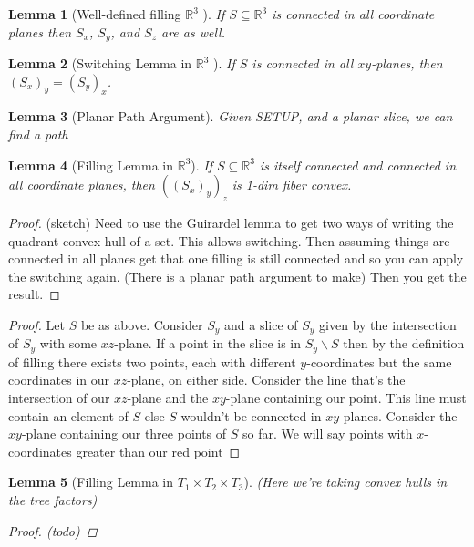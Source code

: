 \documentclass{article}
\newcommand{\sxyz}{((S_x)_y)_z}
\theoremstyle{mystyle}
\newtheorem{lem}{Lemma}[section]
\theoremstyle{remark}
\begin{document}
\begin{lem}
	[Well-defined filling \(\mathbb{R}^{3}\) ]

	If \(S \subseteq \mathbb{R}^{3}\) is connected in all coordinate planes then \(S_x\), \(S_{y}\), and \(S_{z}\) are as well. 
	

\end{lem}

\begin{lem}
	[Switching Lemma in \(\mathbb{R}^{3}\) ]
	 \label{lem:switch} 
	 If \(S\) is connected in all \(xy\)-planes, then \((S_{x})_{y} = (S_{y})_{x}\).
	
\end{lem}
\begin{lem}
    [Planar Path Argument]
    Given SETUP, and a planar slice, we can find a path
\end{lem}
\begin{lem}
    [Filling Lemma in \(\mathbb{R}^{3}\)]
	\label{lem:fillr3}
	If \(S \subseteq \mathbb{R}^{3}\) is itself connected and connected in all coordinate planes, then \(\sxyz\) is 1-dim fiber convex.
\end{lem}
\begin{proof}
    (sketch) Need to use the Guirardel lemma to get two ways of writing the quadrant-convex hull of a set. This allows switching. Then assuming things are connected in all planes get that one filling is still connected and so you can apply the switching again. (There is a planar path argument to make) Then you get the result.
\end{proof}
\begin{proof}
	Let \(S\) be as above. Consider \(S_{ y}\) and a slice of \(S_{ y}\) given by the intersection of \(S_{ y}\) with some \(xz\)-plane. If a point in the slice is in \(S_{y} \smallsetminus   S\) then by the definition of filling there exists two points, each with different \(y\)-coordinates but the same coordinates in our \(xz\)-plane, on either side. Consider the line that's the intersection of our \(xz\)-plane and the \(xy\)-plane containing our point. This line must contain an element of \(S\) else \(S\) wouldn't be connected in \(xy\)-planes. Consider the \(xy\)-plane containing our three points of \(S\) so far. We will say points with \(x\)-coordinates greater than our red point 
\end{proof}
\begin{lem}
    [Filling Lemma in \(T_{1} \times T_{2} \times T_{3}\)]
	\label{lem:fillt3}
    (Here we're taking convex hulls in the tree factors)
\begin{proof}
    (todo)
\end{proof}
\end{lem}
\end{document}
